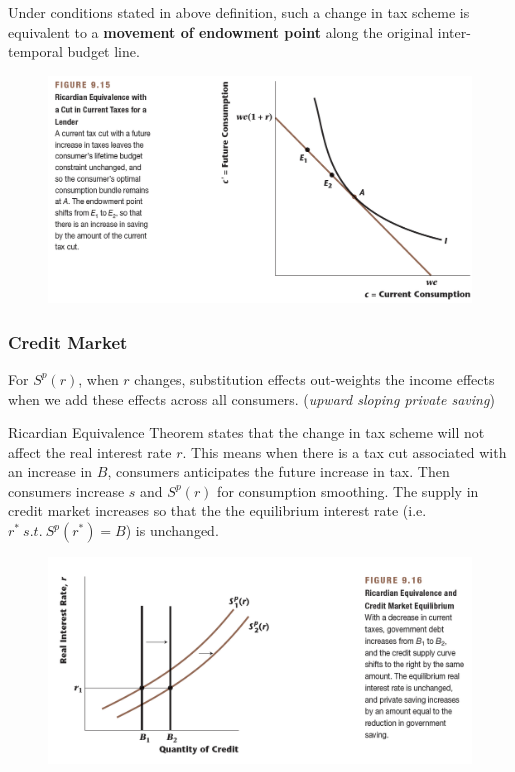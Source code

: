 \documentclass[11pt]{article}
\begin{document}
		\par Under conditions stated in above definition, such a change in tax scheme is equivalent to a \textbf{movement of endowment point} along the original inter-temporal budget line.
		
		\begin{figure}[h]
			\centering
			\includegraphics[width=0.8\linewidth]{figures/915}
		\end{figure}
		
		\newpage
		\subsubsection{Credit Market}
		\begin{assumption}
			For $S^p(r)$, when $r$ changes, substitution effects out-weights the income effects when we add these effects across all consumers. (\emph{upward sloping private saving})
		\end{assumption}
		\par Ricardian Equivalence Theorem states that the change in tax scheme will not affect the real interest rate $r$. This means when there is a tax cut associated with an increase in $B$, consumers anticipates the future increase in tax. Then consumers increase $s$ and $S^p(r)$ for consumption smoothing. The supply in credit market increases so that the the equilibrium interest rate (i.e. $r^*\ s.t.\ S^p(r^*)=B $) is unchanged.
		
		\begin{figure}
			\centering
			\includegraphics[width=0.8\linewidth]{figures/916}
		\end{figure}
		
\end{document}
